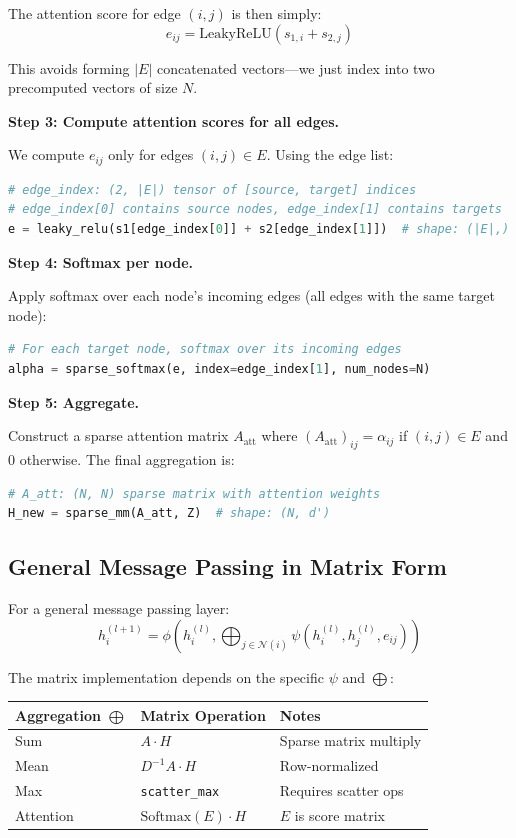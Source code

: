 \begin{notechapter}
The attention score for edge $(i,j)$ is then simply:
\[
e_{ij} = \text{LeakyReLU}(s_{1,i} + s_{2,j})
\]

This avoids forming $|E|$ concatenated vectors---we just index into two 
precomputed vectors of size $N$.

\textbf{Step 3: Compute attention scores for all edges.}

We compute $e_{ij}$ only for edges $(i,j) \in E$. Using the edge list:
\begin{lstlisting}[style=pythonstyle, language=Python]
# edge_index: (2, |E|) tensor of [source, target] indices
# edge_index[0] contains source nodes, edge_index[1] contains targets
e = leaky_relu(s1[edge_index[0]] + s2[edge_index[1]])  # shape: (|E|,)
\end{lstlisting}

\textbf{Step 4: Softmax per node.}

Apply softmax over each node's incoming edges (all edges with the same 
target node):
\begin{lstlisting}[style=pythonstyle, language=Python]
# For each target node, softmax over its incoming edges
alpha = sparse_softmax(e, index=edge_index[1], num_nodes=N)
\end{lstlisting}

\textbf{Step 5: Aggregate.}

Construct a sparse attention matrix $A_{\text{att}}$ where 
$(A_{\text{att}})_{ij} = \alpha_{ij}$ if $(i,j) \in E$ and $0$ otherwise. 
The final aggregation is:
\begin{lstlisting}[style=pythonstyle, language=Python]
# A_att: (N, N) sparse matrix with attention weights
H_new = sparse_mm(A_att, Z)  # shape: (N, d')
\end{lstlisting}

\subsection{General Message Passing in Matrix Form}

For a general message passing layer:
\[
h_i^{(l+1)} = \phi\left( h_i^{(l)}, \bigoplus_{j \in \mathcal{N}(i)} 
    \psi(h_i^{(l)}, h_j^{(l)}, e_{ij}) \right)
\]

The matrix implementation depends on the specific $\psi$ and $\bigoplus$:

\begin{center}
\renewcommand{\arraystretch}{1.3}
\begin{tabular}{lll}
\toprule
\textbf{Aggregation $\bigoplus$} & \textbf{Matrix Operation} & \textbf{Notes} \\
\midrule
Sum & $A \cdot H$ & Sparse matrix multiply \\
Mean & $D^{-1} A \cdot H$ & Row-normalized \\
Max & \texttt{scatter\_max} & Requires scatter ops \\
Attention & $\text{Softmax}(E) \cdot H$ & $E$ is score matrix \\
\bottomrule
\end{tabular}
\end{center}


\end{notechapter}
